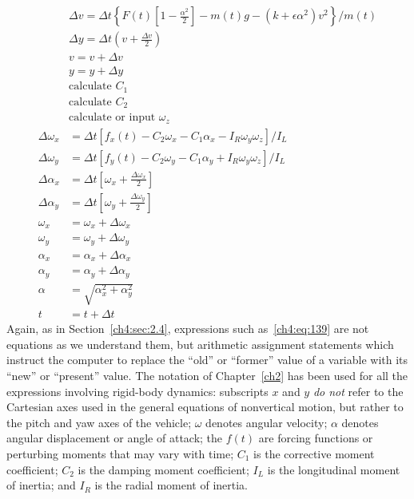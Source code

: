 \begin{align}
&\Delta v = \Delta t\left\{F(t)\left[1 - \frac{\alpha^{2}}{2}\right] - m(t)g
  - (k + \epsilon\alpha^{2})v^{2}\right\}\Big/m(t) \label{ch4:eq:137}\\
&\Delta y = \Delta t\left(v + \frac{\Delta v}{2}\right) \label{ch4:eq:138}\\
&v = v + \Delta v \label{ch4:eq:139}\\
&y = y + \Delta y \label{ch4:eq:140}\\
&\text{calculate } C_1 \label{ch4:eq:141}\\
&\text{calculate } C_2 \label{ch4:eq:142}\\
&\text{calculate or input } \omega_z \label{ch4:eq:143}\\
\Delta\omega_x &= \Delta t[f_x(t) - C_2\omega_x - C_1\alpha_x - I_R\omega_y\omega_z]/I_L
  \label{ch4:eq:144}\\
\Delta\omega_y &= \Delta t[f_y(t) - C_2\omega_y - C_1\alpha_y + I_R\omega_y\omega_z]/I_L
  \label{ch4:eq:145}\\
\Delta\alpha_x &= \Delta t\left[\omega_x + \frac{\Delta\omega_x}{2}\right] \label{ch4:eq:146}\\
\Delta\alpha_y &= \Delta t\left[\omega_y + \frac{\Delta\omega_y}{2}\right] \label{ch4:eq:147}\\
\omega_x &= \omega_x + \Delta\omega_x \label{ch4:eq:148}\\
\omega_y &= \omega_y + \Delta\omega_y \label{ch4:eq:149}\\
\alpha_x &= \alpha_x + \Delta\alpha_x \label{ch4:eq:150}\\
\alpha_y &= \alpha_y + \Delta\alpha_y \label{ch4:eq:151}\\
\alpha &= \sqrt{\alpha_x^{2} + \alpha_y^{2}} \label{ch4:eq:152}\\
t &= t + \Delta t \label{ch4:eq:153}
\end{align}
Again, as in Section~\ref{ch4:sec:2.4}, expressions such as~\eqref{ch4:eq:139} are not equations as we
understand them, but arithmetic assignment statements which instruct the computer to replace the
``old'' or ``former'' value of a variable with its ``new'' or ``present'' value. The notation of
Chapter~\ref{ch2} has been used for all the expressions involving rigid-body dynamics: subscripts
$x$ and $y$ \emph{do not} refer to the Cartesian axes used in the general equations of nonvertical
motion, but rather to the pitch and yaw axes of the vehicle; $\omega$ denotes angular velocity;
$\alpha$ denotes angular displacement or angle of attack; the $f(t)$ are forcing functions or
perturbing moments that may vary with time; $C_1$ is the corrective moment coefficient; $C_2$ is
the damping moment coefficient; $I_L$ is the longitudinal moment of inertia; and $I_R$ is the
radial moment of inertia.

